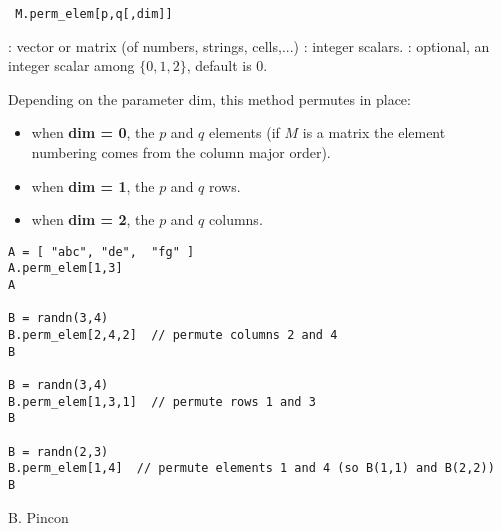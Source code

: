 
\begin{mandesc}
\end{mandesc}

\begin{calling_sequence}
\begin{verbatim}
 M.perm_elem[p,q[,dim]]
\end{verbatim}
\end{calling_sequence}

\begin{parameters}
  \begin{varlist}
   : vector or matrix (of numbers, strings, cells,...)
   : integer scalars.
   : optional, an integer scalar among $\{0,1,2\}$, default is 0.
  \end{varlist}
\end{parameters}

\begin{mandescription}
Depending on the parameter dim, this method permutes in place:  
\begin{itemize}
\item when {\bf dim = 0}, the $p$ and $q$ elements (if $M$ is a matrix
 the element numbering comes from the column  major order).
\item when {\bf dim = 1}, the $p$ and $q$ rows.
\item when {\bf dim = 2}, the $p$ and $q$ columns.
\end{itemize}

\end{mandescription}

\begin{examples}
\begin{Verbatim}
A = [ "abc", "de",  "fg" ]
A.perm_elem[1,3]
A

B = randn(3,4)
B.perm_elem[2,4,2]  // permute columns 2 and 4
B

B = randn(3,4)
B.perm_elem[1,3,1]  // permute rows 1 and 3
B

B = randn(2,3)
B.perm_elem[1,4]  // permute elements 1 and 4 (so B(1,1) and B(2,2))
B
\end{Verbatim}
\end{examples}


\begin{manseealso}
\end{manseealso}

\begin{authors}
B. Pincon
\end{authors}

